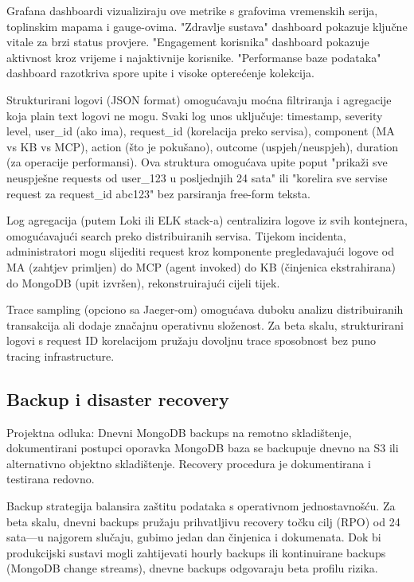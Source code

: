 \documentclass[12pt,a4paper]{article}
\begin{document}
Grafana dashboardi vizualiziraju ove metrike s grafovima vremenskih serija, toplinskim mapama i gauge-ovima. "Zdravlje sustava" dashboard pokazuje ključne vitale za brzi status provjere. "Engagement korisnika" dashboard pokazuje aktivnost kroz vrijeme i najaktivnije korisnike. "Performanse baze podataka" dashboard razotkriva spore upite i visoke opterećenje kolekcija.

Strukturirani logovi (JSON format) omogućavaju moćna filtriranja i agregacije koja plain text logovi ne mogu. Svaki log unos uključuje: timestamp, severity level, user\_id (ako ima), request\_id (korelacija preko servisa), component (MA vs KB vs MCP), action (što je pokušano), outcome (uspjeh/neuspjeh), duration (za operacije performansi). Ova struktura omogućava upite poput "prikaži sve neuspješne requests od user\_123 u posljednjih 24 sata" ili "korelira sve servise request za request\_id abc123" bez parsiranja free-form teksta.

Log agregacija (putem Loki ili ELK stack-a) centralizira logove iz svih kontejnera, omogućavajući search preko distribuiranih servisa. Tijekom incidenta, administratori mogu slijediti request kroz komponente pregledavajući logove od MA (zahtjev primljen) do MCP (agent invoked) do KB (činjenica ekstrahirana) do MongoDB (upit izvršen), rekonstruirajući cijeli tijek.

Trace sampling (opciono sa Jaeger-om) omogućava duboku analizu distribuiranih transakcija ali dodaje značajnu operativnu složenost. Za beta skalu, strukturirani logovi s request ID korelacijom pružaju dovoljnu trace sposobnost bez puno tracing infrastructure.

\subsection{Backup i disaster recovery}

\begin{rationale}{Projektna odluka: Dnevni MongoDB backups na remotno skladištenje, dokumentirani postupci oporavka}
MongoDB baza se backupuje dnevno na S3 ili alternativno objektno skladištenje. Recovery procedura je dokumentirana i testirana redovno.
\end{rationale}

Backup strategija balansira zaštitu podataka s operativnom jednostavnošću. Za beta skalu, dnevni backups pružaju prihvatljivu recovery točku cilj (RPO) od 24 sata—u najgorem slučaju, gubimo jedan dan činjenica i dokumenata. Dok bi produkcijski sustavi mogli zahtijevati hourly backups ili kontinuirane backups (MongoDB change streams), dnevne backups odgovaraju beta profilu rizika.
\end{document}
